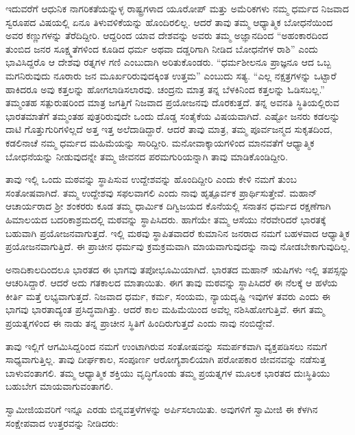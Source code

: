 ಇದುವರೆಗೆ ಆಧುನಿಕ ನಾಗರಿಕತೆಯನ್ನುಳ್ಳ ರಾಷ್ಟ್ರಗಳಾದ ಯೂರೋಪ್​ ಮತ್ತು ಅಮೆರಿಕಗಳು ನಮ್ಮ ಧರ್ಮದ ನಿಜವಾದ ಸ್ವರೂಪದ ವಿಷಯಲ್ಲಿ ಏನೂ ತಿಳುವಳಿಕೆಯನ್ನು ಹೊಂದಿರಲಿಲ್ಲ. ಆದರೆ ತಾವು ತಮ್ಮ ಆಧ್ಯಾತ್ಮಿಕ ಬೋಧನೆಯಿಂದ ಅವರ ಕಣ್ಣುಗಳನ್ನು ತೆರೆದಿದ್ದೀರಿ. ಆದ್ದರಿಂದ ಯಾವ ದೇಶವನ್ನು ಅವರು ತಮ್ಮ ಅಜ್ಞಾನದಿಂದ “ಅಹಂಕಾರದಿಂದ ತುಂಬಿದ ಜನರ ಸೂಕ್ಷ್ಮತೆಗಳಿಂದ ಕೂಡಿದ ಧರ್ಮ ಅಥವಾ ದಡ್ಡರಿಗಾಗಿ ನೀಡಿದ ಬೋಧನೆಗಳ ರಾಶಿ” ಎಂದು ಭಾವಿಸಿದ್ದರೊ ಆ ದೇಶವು ರತ್ನಗಳ ಗಣಿ ಎಂಬುದಾಗಿ ಅರಿತುಕೊಂಡರು. “ಧರ್ಮಶೀಲನೂ ಪ್ರಾಜ್ಞನೂ ಆದ ಒಬ್ಬ ಮಗನಿರುವುದು ನೂರಾರು ಜನ ಮೂರ್ಖರಿರುವುದಕ್ಕಿಂತ ಉತ್ತಮ” ಎಂಬುದು ಸತ್ಯ. “ಎಲ್ಲ ನಕ್ಷತ್ರಗಳನ್ನು ಒಟ್ಟಾರೆ ಹಾಕಿದರೂ ಅವು ಕತ್ತಲನ್ನು ಹೋಗಲಾಡಿಸಲಾರವು. ಚಂದ್ರನು ಮಾತ್ರ ತನ್ನ ಬೆಳಕಿನಿಂದ ಕತ್ತಲನ್ನು ಓಡಿಸಬಲ್ಲ.” ತಮ್ಮಂತಹ ಸತ್ಪುರುಷರಿಂದ ಮಾತ್ರ ಜಗತ್ತಿಗೆ ನಿಜವಾದ ಪ್ರಯೋಜನವು ದೊರಕುತ್ತದೆ. ತನ್ನ ಅವನತಿ ಸ್ಥಿತಿಯಲ್ಲಿರುವ ಭಾರತಮಾತೆಗೆ ತಮ್ಮಂತಹ ಪುತ್ರರಿರುವುದೇ ಒಂದು ದೊಡ್ಡ ಸಂತೈಕೆಯ ವಿಷಯವಾಗಿದೆ. ಎಷ್ಟೋ ಜನರು ಕಡಲನ್ನು ದಾಟಿ ಗೊತ್ತುಗುರಿಗಳಿಲ್ಲದೆ ಅತ್ತ ಇತ್ತ ಅಲೆದಾಡಿದ್ದಾರೆ. ಆದರೆ ತಾವು ಮಾತ್ರ, ತಮ್ಮ ಪೂರ್ವಜನ್ಮದ ಸುಕೃತದಿಂದ, ಕಡಲಿನಾಚೆ ನಮ್ಮ ಧರ್ಮದ ಮಹಿಮೆಯನ್ನು ಸಾರಿದ್ದೀರಿ. ಮನೋವಾಕ್ಕಾಯಗಳಿಂದ ಮಾನವತೆಗೆ ಆಧ್ಯಾತ್ಮಿಕ ಬೋಧನೆಯನ್ನು ನೀಡುವುದನ್ನೇ ತಮ್ಮ ಜೀವನದ ಪರಮಗುರಿಯನ್ನಾಗಿ ತಾವು ಮಾಡಿಕೊಂಡಿದ್ದೀರಿ.

ತಾವು ಇಲ್ಲಿ ಒಂದು ಮಠವನ್ನು ಸ್ಥಾಪಿಸುವ ಉದ್ದೇಶವನ್ನು ಹೊಂದಿದ್ದೀರಿ ಎಂದು ಕೇಳಿ ನಮಗೆ ತುಂಬ ಸಂತೋಷವಾಗಿದೆ. ತಮ್ಮ ಉದ್ದೇಶವು ಸಫಲವಾಗಲಿ ಎಂದು ನಾವು ಹೃತ್ಪೂರ್ವಕ ಪ್ರಾರ್ಥಿಸುತ್ತೇವೆ. ಮಹಾನ್​ ಆಚಾರ್ಯರಾದ ಶ‍್ರೀ ಶಂಕರರು ಕೂಡ ತಮ್ಮ ಧಾರ್ಮಿಕ ದಿಗ್ವಿಜಯದ ಕೊನೆಯಲ್ಲಿ ಸನಾತನ ಧರ್ಮದ ರಕ್ಷಣೆಗಾಗಿ ಹಿಮಾಲಯದ ಬದರಿಕಾಶ್ರಮದಲ್ಲಿ ಮಠವನ್ನು ಸ್ಥಾಪಿಸಿದರು. ಹಾಗೆಯೇ ತಮ್ಮ ಆಸೆಯು ನೆರವೇರಿದರೆ ಭಾರತಕ್ಕೆ ಬಹುವಾಗಿ ಪ್ರಯೋಜನವಾಗುತ್ತದೆ. ಇಲ್ಲಿ ಮಠವು ಸ್ಥಾಪಿತವಾದರೆ ಕುಮಾನಿನ ಜನರಾದ ನಮಗೆ ಬಹಳವಾದ ಆಧ್ಯಾತ್ಮಿಕ ಪ್ರಯೋಜನವಾಗುತ್ತಿದೆ. ಈ ಪ್ರಾಚೀನ ಧರ್ಮವು ಕ್ರಮಕ್ರಮವಾಗಿ ಮಾಯವಾಗುವುದನ್ನು ನಾವು ನೋಡಬೇಕಾಗುವುದಿಲ್ಲ.

ಅನಾದಿಕಾಲದಿಂದಲೂ ಭಾರತದ ಈ ಭಾಗವು ತಪೋಭೂಮಿಯಾಗಿದೆ. ಭಾರತದ ಮಹಾನ್​ ಋಷಿಗಳು ಇಲ್ಲಿ ತಪಸ್ಸನ್ನು ಆಚರಿಸಿದ್ದಾರೆ. ಆದರೆ ಅದು ಗತಕಾಲದ ಮಾತಾಯಿತು. ಈಗ ತಾವು ಮಠವನ್ನು ಸ್ಥಾಪಿಸಿದರೆ ಈ ನೆಲಕ್ಕೆ ಆ ಹಳೆಯ ಕೀರ್ತಿ ಮತ್ತೆ ಲಭ್ಯವಾಗುತ್ತದೆ. ನಿಜವಾದ ಧರ್ಮ, ಕರ್ಮ, ಸಂಯಮ, ನ್ಯಾಯದೃಷ್ಟಿ ಇವುಗಳ ತವರು ಎಂದು ಈ ಭಾಗವು ಭಾರತಾದ್ಯಂತ ಪ್ರಸಿದ್ಧವಾಗಿತ್ತು. ಆದರೆ ಕಾಲ ಮಹಿಮೆಯಿಂದ ಅವೆಲ್ಲ ನಶಿಸಿಹೋಗುತ್ತಿವೆ. ಈಗ ತಮ್ಮ ಪ್ರಯತ್ನಗಳಿಂದ ಈ ನಾಡು ತನ್ನ ಪ್ರಾಚೀನ ಸ್ಥಿತಿಗೆ ಹಿಂದಿರುಗುತ್ತದೆ ಎಂದು ನಾವು ನಂಬಿದ್ದೇವೆ.

ತಾವು ಇಲ್ಲಿಗೆ ಆಗಮಿಸಿದ್ದರಿಂದ ನಮಗೆ ಉಂಟಾಗಿರುವ ಸಂತೋಷವನ್ನು ಸಮರ್ಪಕವಾಗಿ ವ್ಯಕ್ತಪಡಿಸಲು ನಮಗೆ ಸಾಧ್ಯವಾಗುತ್ತಿಲ್ಲ. ತಾವು ದೀರ್ಘಕಾಲ, ಸಂಪೂರ್ಣ ಆರೋಗ್ಯಶಾಲಿಯಾಗಿ ಪರೋಪಕಾರ ಜೀವನವನ್ನು ನಡೆಸುತ್ತ ಬಾಳುವಂತಾಗಲಿ. ತಮ್ಮ ಆಧ್ಯಾತ್ಮಿಕ ಶಕ್ತಿಯು ವೃದ್ಧಿಗೊಂಡು ತಮ್ಮ ಪ್ರಯತ್ನಗಳ ಮೂಲಕ ಭಾರತದ ದುಃಸ್ಥಿತಿಯು ಬಹುಬೇಗ ಮಾಯವಾಗುವಂತಾಗಲಿ.

ಸ್ವಾಮೀಜಿಯವರಿಗೆ ಇನ್ನೂ ಎರಡು ಬಿನ್ನವತ್ತಳೆಗಳನ್ನು ಅರ್ಪಿಸಲಾಯಿತು. ಅವುಗಳಿಗೆ ಸ್ವಾಮೀಜಿ ಈ ಕೆಳಗಿನ ಸಂಕ್ಷೇಪವಾದ ಉತ್ತರವನ್ನು ನೀಡಿದರು:


